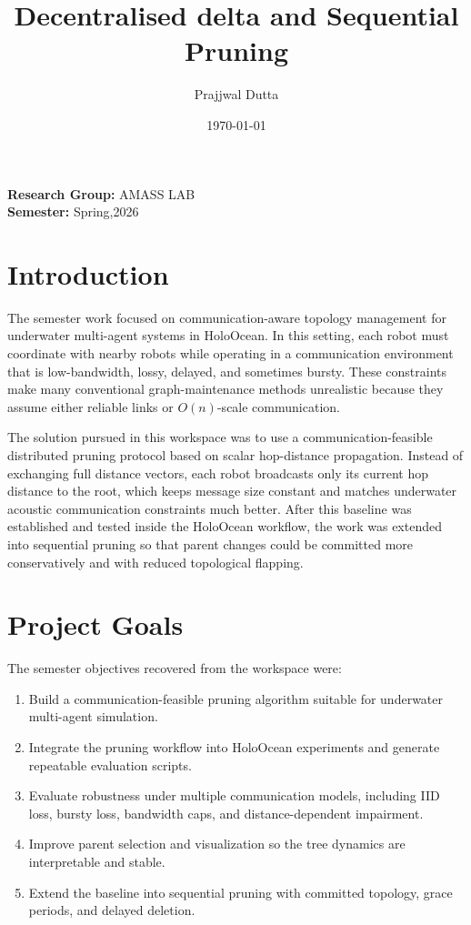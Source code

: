 \documentclass[11pt,a4paper]{article}
\begin{document}

\title{Decentralised delta and Sequential Pruning}
\author{Prajjwal Dutta}
\date{\today}
\maketitle

\textbf{Research Group:} AMASS LAB \\
\textbf{Semester:} Spring,2026 \\
\vspace{1em}

\section{Introduction}

The semester work focused on communication-aware topology management for underwater multi-agent systems in HoloOcean. In this setting, each robot must coordinate with nearby robots while operating in a communication environment that is low-bandwidth, lossy, delayed, and sometimes bursty. These constraints make many conventional graph-maintenance methods unrealistic because they assume either reliable links or \(O(n)\)-scale communication.

The solution pursued in this workspace was to use a communication-feasible distributed pruning protocol based on scalar hop-distance propagation. Instead of exchanging full distance vectors, each robot broadcasts only its current hop distance to the root, which keeps message size constant and matches underwater acoustic communication constraints much better. After this baseline was established and tested inside the HoloOcean workflow, the work was extended into sequential pruning so that parent changes could be committed more conservatively and with reduced topological flapping.

\section{Project Goals}

The semester objectives recovered from the workspace were:
\begin{enumerate}
  \item Build a communication-feasible pruning algorithm suitable for underwater multi-agent simulation.
  \item Integrate the pruning workflow into HoloOcean experiments and generate repeatable evaluation scripts.
  \item Evaluate robustness under multiple communication models, including IID loss, bursty loss, bandwidth caps, and distance-dependent impairment.
  \item Improve parent selection and visualization so the tree dynamics are interpretable and stable.
  \item Extend the baseline into sequential pruning with committed topology, grace periods, and delayed deletion.
\end{enumerate}
\end{document}
